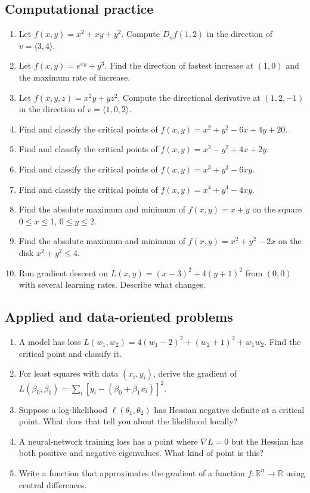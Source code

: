 \documentclass[11pt]{article}
\newcommand{\R}{\mathbb R}
\newcommand{\grad}{\nabla}
\begin{document}
\subsection*{Computational practice}
\begin{enumerate}
  \item Let $f(x,y)=x^2+xy+y^2$. Compute $D_u f(1,2)$ in the direction of $v=\langle 3,4\rangle$.
  \item Let $f(x,y)=e^{xy}+y^3$. Find the direction of fastest increase at $(1,0)$ and the maximum rate of increase.
  \item Let $f(x,y,z)=x^2y+yz^2$. Compute the directional derivative at $(1,2,-1)$ in the direction of $v=\langle 1,0,2\rangle$.
  \item Find and classify the critical points of $f(x,y)=x^2+y^2-6x+4y+20$.
  \item Find and classify the critical points of $f(x,y)=x^2-y^2+4x+2y$.
  \item Find and classify the critical points of $f(x,y)=x^3+y^3-6xy$.
  \item Find and classify the critical points of $f(x,y)=x^4+y^4-4xy$.
  \item Find the absolute maximum and minimum of $f(x,y)=x+y$ on the square $0\le x\le 1$, $0\le y\le 2$.
  \item Find the absolute maximum and minimum of $f(x,y)=x^2+y^2-2x$ on the disk $x^2+y^2\le 4$.
  \item Run gradient descent on $L(x,y)=(x-3)^2+4(y+1)^2$ from $(0,0)$ with several learning rates. Describe what changes.
\end{enumerate}

\subsection*{Applied and data-oriented problems}
\begin{enumerate}
  \item A model has loss $L(w_1,w_2)=4(w_1-2)^2+(w_2+1)^2+w_1w_2$. Find the critical point and classify it.
  \item For least squares with data $(x_i,y_i)$, derive the gradient of $L(\beta_0,\beta_1)=\sum_i[y_i-(\beta_0+\beta_1x_i)]^2$.
  \item Suppose a log-likelihood $\ell(\theta_1,\theta_2)$ has Hessian negative definite at a critical point. What does that tell you about the likelihood locally?
  \item A neural-network training loss has a point where $\grad L=0$ but the Hessian has both positive and negative eigenvalues. What kind of point is this?
  \item Write a function that approximates the gradient of a function $f:\R^n\to\R$ using central differences.
\end{enumerate}
\end{document}
